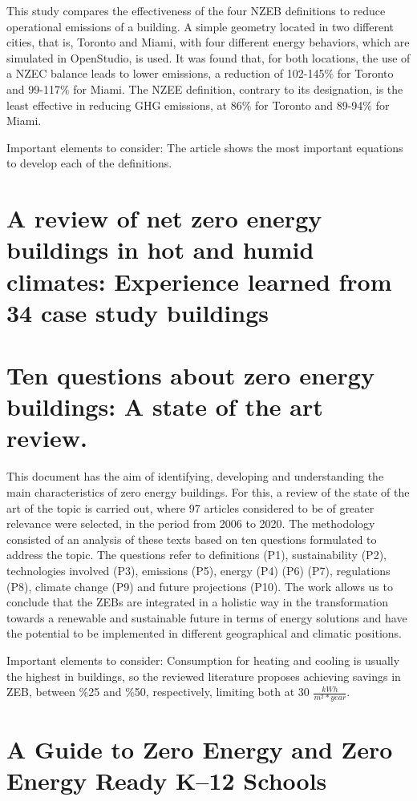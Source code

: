 This study compares the effectiveness of the four NZEB definitions to reduce operational emissions of a building. A simple geometry located in two different cities, that is, Toronto and Miami, with four different energy behaviors, which are simulated in OpenStudio, is used. It was found that, for both locations, the use of a NZEC balance leads to lower emissions, a reduction of 102-145$\%$ for Toronto and 99-117$\%$ for Miami. The NZEE definition, contrary to its designation, is the least effective in reducing GHG emissions, at 86$\%$ for Toronto and 89-94$\%$ for Miami.

Important elements to consider: The article shows the most important equations to develop each of the definitions.


\section{A review of net zero energy buildings in hot and humid climates: Experience learned from 34 case study buildings}

\section{Ten questions about zero energy buildings: A state of the art review.}

This document has the aim of identifying, developing and understanding the main characteristics of zero energy buildings. For this, a review of the state of the art of the topic is carried out, where 97 articles considered to be of greater relevance were selected, in the period from 2006 to 2020. The methodology consisted of an analysis of these texts based on ten questions formulated to address the topic. The questions refer to definitions (P1), sustainability (P2), technologies involved (P3), emissions (P5), energy (P4) (P6) (P7), regulations (P8), climate change (P9) and future projections (P10). The work allows us to conclude that the ZEBs are integrated in a holistic way in the transformation towards a renewable and sustainable future in terms of energy solutions and have the potential to be implemented in different geographical and climatic positions.


Important elements to consider: Consumption for heating and cooling is usually the highest in buildings, so the reviewed literature proposes achieving savings in ZEB, between $\%$25 and $\%$50, respectively, limiting both at 30 $\frac{kWh}{m^{2}*year}$.


\section{A Guide to Zero Energy and Zero Energy Ready K–12 Schools}


